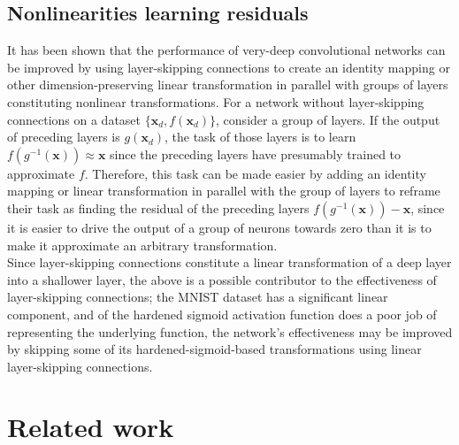 \documentclass[format=sigconf]{acmart}
\newcommand{\mtx}[1]{\bm{#1}}
\newcommand{\npar}{\\\indent}
\begin{document}
\subsection{Nonlinearities learning residuals}
\label{sec:residuals}

It has been shown \cite{he2015, ioffe2015} that the performance of very-deep convolutional networks can be improved by using layer-skipping connections to create an identity mapping or other dimension-preserving linear transformation in parallel with groups of layers constituting nonlinear transformations. For a network without layer-skipping connections on a dataset $\{\mtx{x}_d,f(\mtx{x}_d)\}$, consider a group of layers. If the output of preceding layers is $g(\mtx{x}_d)$, the task of those layers is to learn $f(g^{-1}(\mtx{x}))\approx \mtx{x}$ since the preceding layers have presumably trained to approximate $f$. Therefore, this task can be made easier by adding an identity mapping or linear transformation in parallel with the group of layers to reframe their task as finding the residual of the preceding layers $f(g^{-1}(\mtx{x}))-\mtx{x}$, since it is easier to drive the output of a group of neurons towards zero than it is to make it approximate an arbitrary transformation.
\npar
Since layer-skipping connections constitute a linear transformation of a deep layer into a shallower layer, the above is a possible contributor to the effectiveness of layer-skipping connections; the MNIST dataset has a significant linear component, and of the hardened sigmoid activation function does a poor job of representing the underlying function, the network's effectiveness may be improved by skipping some of its hardened-sigmoid-based transformations using linear layer-skipping connections.


\section{Related work}
\end{document}
